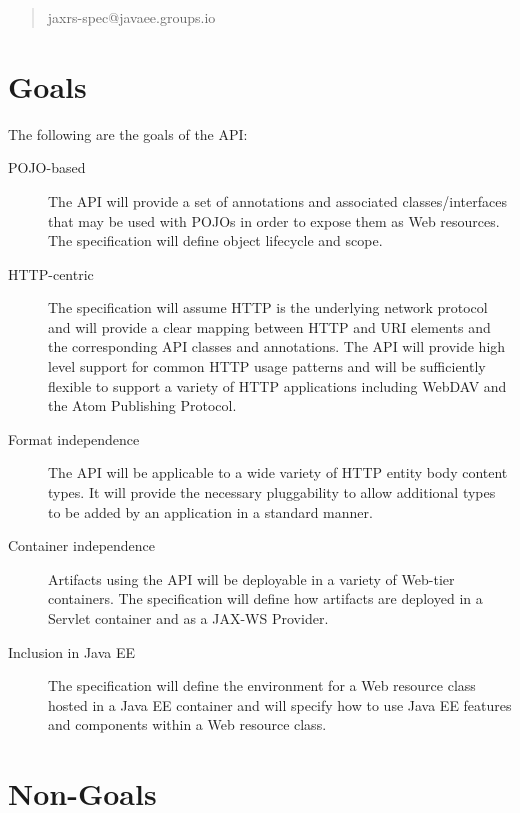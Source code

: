 \begin{quote}
jaxrs-spec@javaee.groups.io
\end{quote}

\section{Goals}

The following are the goals of the API:

\begin{description}

\item[POJO-based] The API will provide a set of annotations and associated classes/interfaces that may be used with POJOs in order to expose them as Web resources. The specification will define object lifecycle and scope.

\item[HTTP-centric] The specification will assume HTTP\cite{http11} is the underlying network protocol and will provide a clear mapping between HTTP and URI\cite{uri} elements and the corresponding API classes and annotations. The API will provide high level support for common HTTP usage patterns and will be sufficiently flexible to support a variety of HTTP applications including WebDAV\cite{webdav} and the Atom Publishing Protocol\cite{atompub}.

\item[Format independence] The API will be applicable to a wide variety of HTTP entity body content types. It will provide the necessary pluggability to allow additional types to be added by an application in a standard manner.

\item[Container independence] Artifacts using the API will be deployable in a variety of Web-tier containers. The specification will define how artifacts are deployed in a Servlet\cite{servlet} container and as a JAX-WS\cite{jsr224} Provider.

\item[Inclusion in Java EE] The specification will define the environment for a Web resource class hosted in a Java EE container and will specify how to use Java EE features and components within a Web resource class.

\end{description}

\section{Non-Goals}
\label{non_goals}

